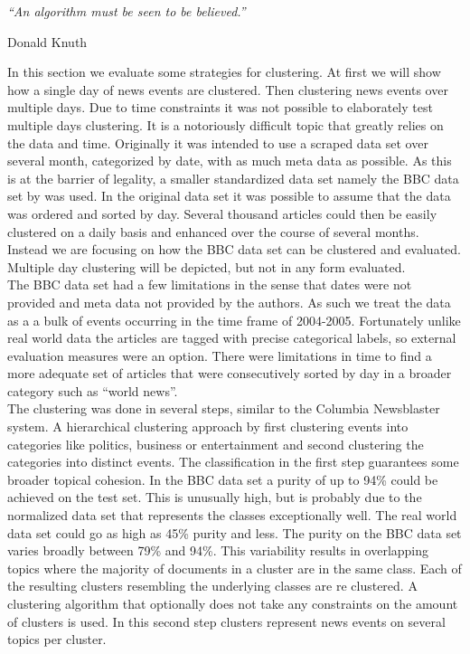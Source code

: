 \epigraph{\emph{
  ``An algorithm must be seen to be believed.''
}}{ Donald Knuth }

In this section we evaluate some strategies for clustering. At first we will show how a single day of news events are clustered. Then clustering news events over multiple days. Due to time constraints it was not possible to elaborately test multiple days clustering. It is a notoriously difficult topic that greatly relies on the data and time. Originally it was intended to use a scraped data set over several month, categorized by date, with as much meta data as possible. As this is at the barrier of legality, a smaller standardized data set namely the BBC data set by \cite{BBCData2006} was used. In the original data set it was possible to assume that the data was ordered and sorted by day. Several thousand articles could then be easily clustered on a daily basis and enhanced over the course of several months. Instead we are focusing on how the BBC data set can be clustered and evaluated. Multiple day clustering will be depicted, but not in any form evaluated.\\

The BBC data set had a few limitations in the sense that dates were not provided and meta data not provided by the authors. As such we treat the data as a a bulk of events occurring in the time frame of 2004-2005. Fortunately unlike real world data the articles are tagged with precise categorical labels, so external evaluation measures were an option. There were limitations in time to find a more adequate set of articles that were consecutively sorted by day in a broader category such as ``world news''.\\

The clustering was done in several steps, similar to the Columbia Newsblaster system.\cite{NewsBlaster2002} A hierarchical clustering approach by first clustering events into categories like politics, business or entertainment and second clustering the categories into distinct events. The classification in the first step guarantees some broader topical cohesion. In the BBC data set a purity of up to 94\% could be achieved on the test set. This is unusually high, but is probably due to the normalized data set that represents the classes exceptionally well. The real world data set could go as high as 45\% purity and less. The purity on the BBC data set varies broadly between 79\% and 94\%. This variability results in overlapping topics where the majority of documents in a cluster are in the same class. Each of the resulting clusters resembling the underlying classes are re clustered. A clustering algorithm that optionally does not take any constraints on the amount of clusters is used. In this second step clusters represent news events on several topics per cluster.\\

